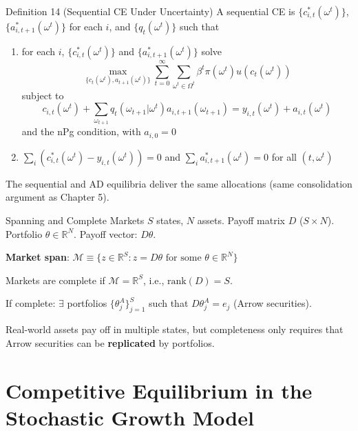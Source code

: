 \documentclass[blue]{beamer}
\begin{document}
\begin{frame}{Definition 14 (Sequential CE Under Uncertainty)}
	\small
	A sequential CE is $\{c_{i,t}^*(\omega^t)\}$, $\{a_{i,t+1}^*(\omega^t)\}$ for each $i$, and $\{q_t(\omega^t)\}$ such that
	
	\begin{enumerate}
		\item for each $i$, $\{c_{i,t}^*(\omega^t)\}$ and $\{a_{i,t+1}^*(\omega^t)\}$ solve
		\[
		\max_{\{c_t(\omega^t), a_{t+1}(\omega^t)\}} \sum_{t=0}^{\infty} \sum_{\omega^t \in \Omega^t} \beta^t \pi(\omega^t) u(c_t(\omega^t))
		\]
		subject to
		\[
		c_{i,t}(\omega^t) + \sum_{\omega_{t+1}} q_t(\omega_{t+1}|\omega^t) a_{i,t+1}(\omega_{t+1}) = y_{i,t}(\omega^t) + a_{i,t}(\omega^t)
		\]
		and the nPg condition, with $a_{i,0} = 0$
		
		\item $\sum_{i} (c_{i,t}^*(\omega^t) - y_{i,t}(\omega^t)) = 0$ and $\sum_{i} a_{i,t+1}^*(\omega^t) = 0$ for all $(t, \omega^t)$
	\end{enumerate}
	
	\normalsize
	\medskip
	The sequential and AD equilibria deliver the same allocations (same consolidation argument as Chapter 5).
\end{frame}

\begin{frame}{Spanning and Complete Markets}
	$S$ states, $N$ assets. Payoff matrix $D$ ($S \times N$). Portfolio $\theta \in \mathbb{R}^N$. Payoff vector: $D\theta$.
	
	\bigskip
	\textbf{Market span}: $\mathcal{M} \equiv \{z \in \mathbb{R}^S : z = D\theta \text{ for some } \theta \in \mathbb{R}^N\}$
	
	Markets are complete if $\mathcal{M} = \mathbb{R}^S$, i.e., $\text{rank}(D) = S$.
	
	\bigskip
	If complete: $\exists$ portfolios $\{\theta_j^A\}_{j=1}^S$ such that $D\theta_j^A = e_j$ (Arrow securities).
	
	\bigskip
	Real-world assets pay off in multiple states, but completeness only requires that Arrow securities can be \textbf{replicated} by portfolios.
\end{frame}

\section{Competitive Equilibrium in the Stochastic Growth Model}
\end{document}

